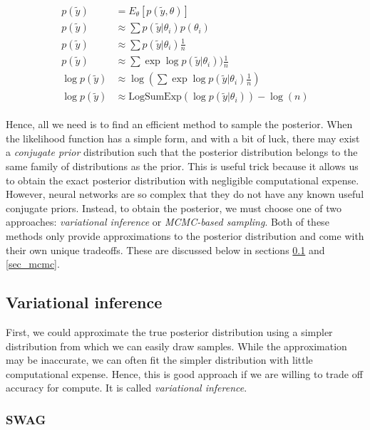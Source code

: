 \documentclass[12pt]{article}
\begin{document}
{\begin{align}
\begin{split}
p(\tilde{y}) &= E_\theta [p(\tilde{y}, \theta)] \\
p(\tilde{y}) &\approx \sum p(\tilde{y}|\theta_i) p(\theta_i) \\
p(\tilde{y}) &\approx \sum p(\tilde{y}|\theta_i) \frac{1}{n} \\
p(\tilde{y}) &\approx \sum \exp \log p(\tilde{y}|\theta_i)) \frac{1}{n} \\
\log p(\tilde{y}) &\approx \log(\sum \exp \log p(\tilde{y}|\theta_i) \frac{1}{n}) \\
\log p(\tilde{y}) &\approx \textrm{LogSumExp} (\log p(\tilde{y}|\theta_i)) - \log(n)
\end{split}
\end{align}

Hence, all we need is to find an efficient method to sample the posterior. When the likelihood function has a simple form, and with a bit of luck, there may exist a \textit{conjugate prior} distribution such that the posterior distribution belongs to the same family of distributions as the prior. This is useful trick because it allows us to obtain the exact posterior distribution with negligible computational expense. However, neural networks are so complex that they do not have any known useful conjugate priors. Instead, to obtain the posterior, we must choose one of two approaches: \textit{variational inference} or \textit{MCMC-based sampling}. Both of these methods only provide approximations to the posterior distribution and come with their own unique tradeoffs. These are discussed below in sections \ref{sec_vi} and \ref{sec_mcmc}.

\subsection{Variational inference}
\label{sec_vi}

First, we could approximate the true posterior distribution using a simpler distribution from which we can easily draw samples. While the approximation may be inaccurate, we can often fit the simpler distribution with little computational expense. Hence, this is good approach if we are willing to trade off accuracy for compute. It is called \textit{variational inference}.

\subsubsection{SWAG}

}
\end{document}
